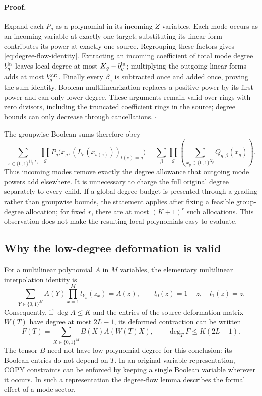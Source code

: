 \paragraph{Proof.}
Expand each $P_g$ as a polynomial in its incoming $Z$ variables. Each
mode occurs as an incoming variable at exactly one target; substituting
its linear form contributes its power at exactly one source. Regrouping
these factors gives \eqref{eq:degree-flow-identity}. Extracting an
incoming coefficient of total mode degree $b_g^{\rm in}$ leaves local
degree at most $K_g-b_g^{\rm in}$; multiplying the outgoing linear forms
adds at most $b_g^{\rm out}$. Finally every $\beta_e$ is subtracted once
and added once, proving the sum identity. Boolean multilinearization
replaces a positive power by its first power and can only lower degree.
These arguments remain valid over rings with zero divisors, including
the truncated coefficient rings in the source; degree bounds can only
decrease through cancellations. \hfill$\square$

The groupwise Boolean sums therefore obey
\[
 \sum_{x\in\{0,1\}^{\bigsqcup_g X_g}}
 \prod_g P_g\bigl(x_g,(L_e(x_{s(e)}))_{t(e)=g}\bigr)
 =\sum_\beta\prod_g
       \left(\sum_{x_g\in\{0,1\}^{X_g}}Q_{g,\beta}(x_g)\right).
\]
Thus incoming modes remove exactly the degree allowance that outgoing
mode powers add elsewhere. It is unnecessary to charge the full original
degree separately to every child. If a global degree budget is presented
through a grading rather than groupwise bounds, the statement applies
after fixing a feasible group-degree allocation; for fixed $r$, there
are at most $(K+1)^r$ such allocations. This observation does not make
the resulting local polynomials easy to evaluate.

\subsection{Why the low-degree deformation is valid}
For a multilinear polynomial $A$ in $M$ variables, the elementary
multilinear interpolation identity is
\[
 \sum_{Y\in\{0,1\}^M}A(Y)
       \prod_{x=1}^M l_{Y_x}(z_x)=A(z),
 \qquad l_0(z)=1-z,\quad l_1(z)=z.
\]
Consequently, if $\deg A\le K$ and the entries of the source deformation
matrix $W(T)$ have degree at most $2L-1$, its deformed contraction can
be written
\[
 F(T)=\sum_{X\in\{0,1\}^M} B(X)A(W(T)X),
 \qquad \deg_T F\le K(2L-1).
\]
The tensor $B$ need not have low polynomial degree for this conclusion:
its Boolean entries do not depend on $T$. In an original-variable
representation, COPY constraints can be enforced by keeping a single
Boolean variable wherever it occurs. In such a representation the
degree-flow lemma describes the formal effect of a mode sector.

